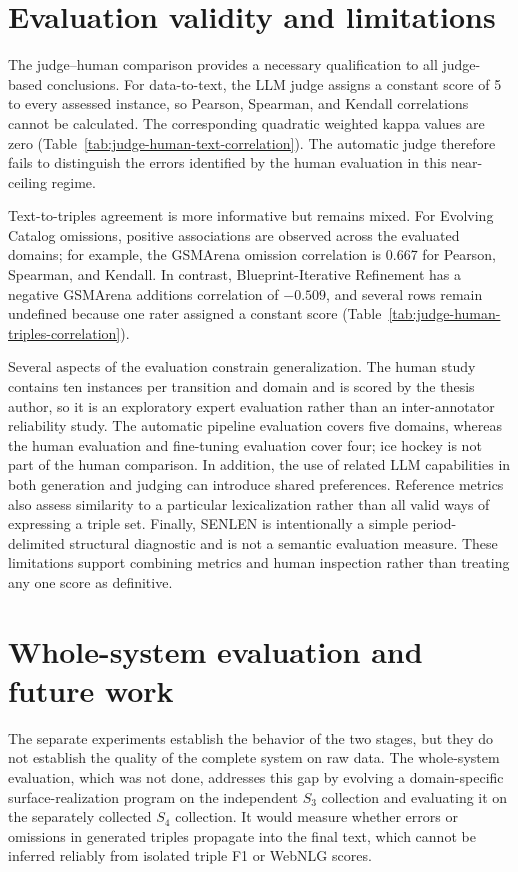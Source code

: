 \section{Evaluation validity and limitations}

The judge--human comparison provides a necessary qualification to all
judge-based conclusions. For data-to-text, the LLM judge assigns a constant
score of 5 to every assessed instance, so Pearson, Spearman, and Kendall
correlations cannot be calculated. The corresponding quadratic weighted kappa
values are zero
(Table~\ref{tab:judge-human-text-correlation}). The automatic judge therefore
fails to distinguish the errors identified by the human evaluation in this
near-ceiling regime.

Text-to-triples agreement is more informative but remains mixed. For Evolving
Catalog omissions, positive associations are observed across the evaluated
domains; for example, the GSMArena omission correlation is 0.667 for Pearson,
Spearman, and Kendall. In contrast, Blueprint-Iterative Refinement has a
negative GSMArena additions correlation of $-0.509$, and several rows remain
undefined because one rater assigned a constant score
(Table~\ref{tab:judge-human-triples-correlation}).

Several aspects of the evaluation constrain generalization. The human study
contains ten instances per transition and domain and is scored by the thesis
author, so it is an exploratory expert evaluation rather than an
inter-annotator reliability study. The automatic pipeline evaluation covers
five domains, whereas the human evaluation and fine-tuning evaluation cover
four; ice hockey is not part of the human comparison. In addition, the use of
related LLM capabilities in both generation and judging can introduce shared
preferences. Reference metrics also assess similarity to a particular
lexicalization rather than all valid ways of expressing a triple set. Finally,
SENLEN is intentionally a simple period-delimited structural diagnostic and is
not a semantic evaluation measure. These limitations support combining metrics
and human inspection rather than treating any one score as definitive.

\section{Whole-system evaluation and future work}

The separate experiments establish the behavior of the two stages, but they do
not establish the quality of the complete system on raw data. The
whole-system evaluation, which was not done, addresses this gap by evolving a domain-specific
surface-realization program on the independent $S_3$ collection and evaluating
it on the separately collected $S_4$ collection. It would measure whether errors
or omissions in generated triples propagate into the final text, which cannot
be inferred reliably from isolated triple F1 or WebNLG scores.

